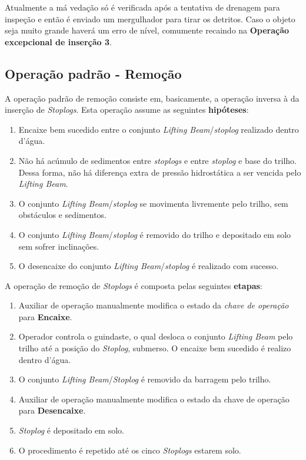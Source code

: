 Atualmente a má vedação só é verificada após a tentativa de drenagem para
inspeção e então é enviado um mergulhador para tirar os detritos. Caso o objeto
seja muito grande haverá um erro de nível, comumente recaindo na \textbf{Operação
excepcional de inserção 3}. 




\subsection{Operação padrão - Remoção}
A operação padrão de remoção consiste em, basicamente, a operação inversa à da inserção de \emph{Stoplogs}. Esta operação assume as seguintes \textbf{hipóteses}:

\begin{enumerate}
\item Encaixe bem sucedido entre o conjunto \emph{Lifting Beam}/\emph{stoplog}
realizado dentro d'água.
\item Não há acúmulo de sedimentos entre \emph{stoplogs} e entre \emph{stoplog} e base do trilho. Dessa forma, não há diferença extra de pressão hidrostática a ser vencida pelo \emph{Lifting Beam}.
\label{hip:rem:2}
\item O conjunto \emph{Lifting Beam}/\emph{stoplog} se movimenta livremente pelo trilho, sem obstáculos e sedimentos.
\item O conjunto \emph{Lifting Beam}/\emph{stoplog} é removido do trilho e depositado em solo sem sofrer inclinações.  
\item O desencaixe do conjunto \emph{Lifting Beam}/\emph{stoplog} é realizado com sucesso.
\end{enumerate}

A operação de remoção de \emph{Stoplogs} é composta pelas seguintes \textbf{etapas}:
\begin{enumerate}
\item Auxiliar de operação manualmente modifica o estado da \emph{chave de operação} para \textbf{Encaixe}.
\item Operador controla o guindaste, o qual desloca o conjunto \emph{Lifting Beam} pelo trilho até a posição do \emph{Stoplog}, submerso. O encaixe bem sucedido é realizo dentro d'água.
\item O conjunto \emph{Lifting Beam}/\emph{Stoplog} é removido da barragem pelo trilho. 
\item Auxiliar de operação manualmente modifica o estado da chave de operação para \textbf{Desencaixe}.
\item \emph{Stoplog} é depositado em solo.
\item O procedimento é repetido até os cinco \emph{Stoplogs} estarem solo.
\end{enumerate}

